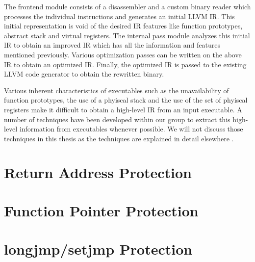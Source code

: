 The frontend module consists of a disassembler and a custom binary reader which processes the
individual instructions and generates an initial LLVM IR. This initial representation is void of the
desired IR features like function prototypes, abstract stack and virtual registers. The internal
pass module analyzes this initial IR to obtain an improved IR which has all the information and
features mentioned previously. Various optimization passes can be written on the above IR to obtain
an optimized IR. Finally, the optimized IR is passed to the existing LLVM code generator to obtain
the rewritten binary.

Various inherent characteristics of executables such as the unavailability of function prototypes,
the use of a phyiscal stack and the use of the set of phyiscal registers make it difficult to obtain
a high-level IR from an input executable. A number of techniques have been developed within our
group to extract this high-level information from executables whenever possible. We will not discuss
those techniques in this thesis as the techniques are explained in detail elsewhere \cite{}.


\section{Return Address Protection}

\section{Function Pointer Protection}

\section{longjmp/setjmp Protection}
